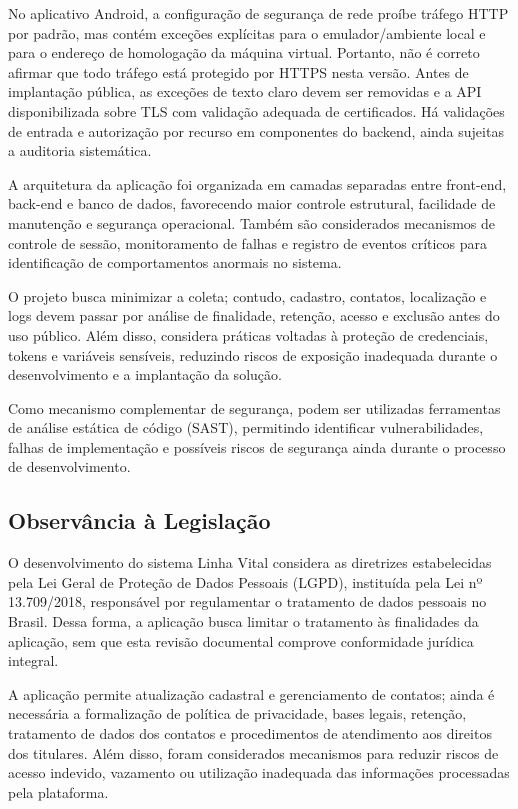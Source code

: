 No aplicativo Android, a configuração de segurança de rede proíbe tráfego HTTP por padrão, mas contém exceções explícitas para o emulador/ambiente local e para o endereço de homologação da máquina virtual. Portanto, não é correto afirmar que todo tráfego está protegido por HTTPS nesta versão. Antes de implantação pública, as exceções de texto claro devem ser removidas e a API disponibilizada sobre TLS com validação adequada de certificados. Há validações de entrada e autorização por recurso em componentes do backend, ainda sujeitas a auditoria sistemática.

A arquitetura da aplicação foi organizada em camadas separadas entre front-end, back-end e banco de dados, favorecendo maior controle estrutural, facilidade de manutenção e segurança operacional. Também são considerados mecanismos de controle de sessão, monitoramento de falhas e registro de eventos críticos para identificação de comportamentos anormais no sistema.

O projeto busca minimizar a coleta; contudo, cadastro, contatos, localização e logs devem passar por análise de finalidade, retenção, acesso e exclusão antes do uso público. Além disso, considera práticas voltadas à proteção de credenciais, tokens e variáveis sensíveis, reduzindo riscos de exposição inadequada durante o desenvolvimento e a implantação da solução.

Como mecanismo complementar de segurança, podem ser utilizadas ferramentas de análise estática de código (SAST), permitindo identificar vulnerabilidades, falhas de implementação e possíveis riscos de segurança ainda durante o processo de desenvolvimento.

\subsection{Observância à Legislação}

O desenvolvimento do sistema Linha Vital considera as diretrizes estabelecidas pela Lei Geral de Proteção de Dados Pessoais (LGPD), instituída pela Lei nº 13.709/2018, responsável por regulamentar o tratamento de dados pessoais no Brasil. Dessa forma, a aplicação busca limitar o tratamento às finalidades da aplicação, sem que esta revisão documental comprove conformidade jurídica integral.

A aplicação permite atualização cadastral e gerenciamento de contatos; ainda é necessária a formalização de política de privacidade, bases legais, retenção, tratamento de dados dos contatos e procedimentos de atendimento aos direitos dos titulares. Além disso, foram considerados mecanismos para reduzir riscos de acesso indevido, vazamento ou utilização inadequada das informações processadas pela plataforma.

